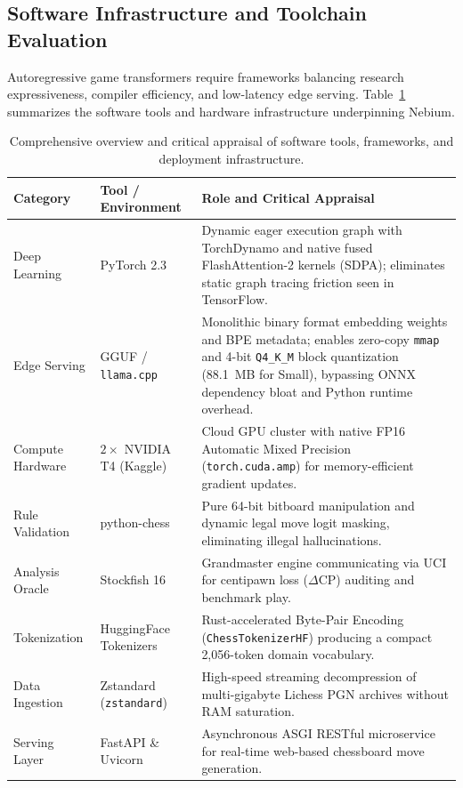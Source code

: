 \subsection{Software Infrastructure and Toolchain Evaluation}
\label{sec:tools}

Autoregressive game transformers require frameworks balancing research expressiveness, compiler efficiency, and low-latency edge serving. Table~\ref{tab:software_tools} summarizes the software tools and hardware infrastructure underpinning Nebium.

\begin{table}[H]
\centering
\small
\caption[Software Tools, Frameworks, and Infrastructure]{Comprehensive overview and critical appraisal of software tools, frameworks, and deployment infrastructure.}
\label{tab:software_tools}
\begin{tabularx}{\linewidth}{l p{3.2cm} X}
\toprule
\textbf{Category} & \textbf{Tool / Environment} & \textbf{Role and Critical Appraisal} \\
\midrule
Deep Learning & PyTorch 2.3 \parencite{paszke2019pytorch} & Dynamic eager execution graph with TorchDynamo and native fused FlashAttention-2 kernels (SDPA); eliminates static graph tracing friction seen in TensorFlow. \\
Edge Serving & GGUF / \texttt{llama.\allowbreak cpp} \parencite{gerganov2023llamacpp} & Monolithic binary format embedding weights and BPE metadata; enables zero-copy \texttt{mmap} and 4-bit \texttt{Q4\_K\_M} block quantization (88.1~MB for Small), bypassing ONNX dependency bloat and Python runtime overhead. \\
Compute Hardware & $2\times$ NVIDIA T4 (Kaggle) & Cloud GPU cluster with native FP16 Automatic Mixed Precision (\texttt{torch.cuda.amp}) for memory-efficient gradient updates. \\
Rule Validation & python-chess \parencite{romstad2024pythonchess} & Pure 64-bit bitboard manipulation and dynamic legal move logit masking, eliminating illegal hallucinations. \\
Analysis Oracle & Stockfish 16 \parencite{stockfish2023} & Grandmaster engine communicating via UCI for centipawn loss ($\Delta\text{CP}$) auditing and benchmark play. \\
Tokenization & HuggingFace Tokenizers & Rust-accelerated Byte-Pair Encoding (\texttt{ChessTokenizerHF}) producing a compact 2,056-token domain vocabulary. \\
Data Ingestion & Zstandard (\texttt{zstandard}) & High-speed streaming decompression of multi-gigabyte Lichess PGN archives without RAM saturation. \\
Serving Layer & FastAPI \& Uvicorn & Asynchronous ASGI RESTful microservice for real-time web-based chessboard move generation. \\
\bottomrule
\end{tabularx}
\end{table}


